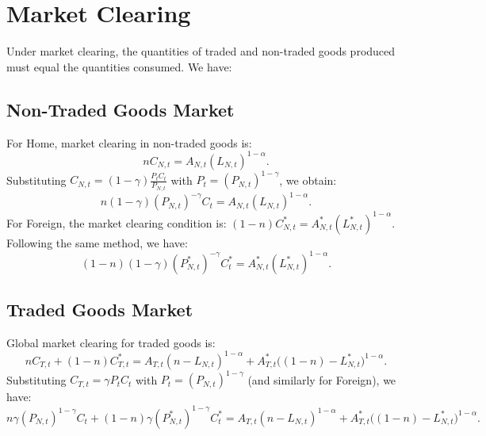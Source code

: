\documentclass[a4paper,12pt]{article} %
\theoremstyle{nonitalic}
\begin{document}

\section{Market Clearing}
Under market clearing, the quantities of traded and non-traded goods produced must equal the quantities consumed. We have:
\subsection*{Non-Traded Goods Market}
For Home, market clearing in non-traded goods is:
\[
n C_{N,t} = A_{N,t} (L_{N,t})^{ 1-\alpha}.
\]
Substituting $ C_{N,t} = (1-\gamma)\frac{P_t C_t}{P_{N,t}}$ with $ P_t = (P_{N,t})^{1-\gamma} $, we obtain:
\[
n(1-\gamma) (P_{N,t})^{-\gamma} C_t = A_{N,t} (L_{N,t})^{ 1-\alpha}. \tag{2a}
\]
For Foreign, the market clearing condition is: $(1-n)C_{N,t}^* = A_{N,t}^*(L_{N,t}^*)^{1-\alpha}$. Following the same method, we have:
\[
(1-n)(1-\gamma) (P^*_{N,t})^{-\gamma} C^*_t = A^*_{N,t} (L^*_{N,t})^{ 1-\alpha}. \tag{2b}
\]

\subsection*{Traded Goods Market}
Global market clearing for traded goods is:
\[
n C_{T,t} + (1-n) C^*_{T,t} = A_{T,t} (n-L_{N,t})^{ 1-\alpha} + A^*_{T,t} \big((1-n)-L^*_{N,t}\big)^{ 1-\alpha}.
\]
Substituting $ C_{T,t}=\gamma P_t C_t $ with $ P_t=(P_{N,t})^{1-\gamma} $ (and similarly for Foreign), we have:
\[
n\gamma (P_{N,t})^{1-\gamma} C_t + (1-n)\gamma (P^*_{N,t})^{1-\gamma} C^*_t = A_{T,t} (n-L_{N,t})^{ 1-\alpha} + A^*_{T,t} \big((1-n)-L^*_{N,t}\big)^{ 1-\alpha}. \tag{2c}
\]
\end{document}
